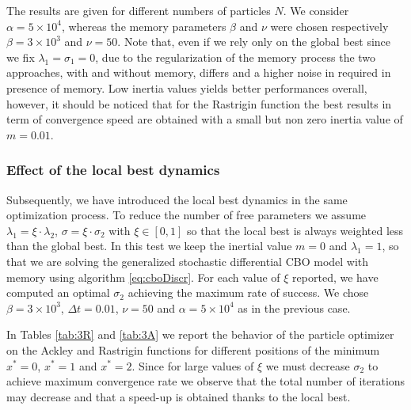 \documentclass{ims9x6}
\begin{document}
The results are given for different numbers of particles $N$. We consider $\alpha = 5 \times 10^4$, whereas
the memory parameters $\beta$ and $\nu$ were chosen respectively $\beta=3\times 10^3$ and $\nu=50$.
Note that, even if we rely only on the global best since we fix $\lambda_1=\sigma_1=0$, due to the regularization of the memory process the two approaches, with and without memory, differs and a higher noise in required in presence of memory. Low inertia values yields better performances overall, however, it should be noticed that for the Rastrigin function the best results in term of convergence speed are obtained with a small but non zero inertia value of $m=0.01$.  


\subsubsection{Effect of the local best dynamics}
Subsequently, we have introduced the local best dynamics in the same optimization process. To reduce the number of free parameters we assume $\lambda_1 = \xi \cdot \lambda_2$, $\sigma = \xi \cdot \sigma_2$
with $\xi \in [0,1]$ so that the local best is always weighted less than the global best. In this test we keep the inertial value $m = 0$ and $\lambda_1=1$, so that we are solving the generalized stochastic differential CBO model with memory using algorithm \eqref{eq:cboDiscr}. For each value of $\xi$ reported, we have computed an optimal $\sigma_2$ achieving the maximum rate of success. We chose $\beta = 3\times 10^3$, $\Delta t=0.01$, $\nu=50$  and  $\alpha = 5 \times 10^4$ as in the previous case. 

In Tables \ref{tab:3R} and \ref{tab:3A} we report the behavior of the particle optimizer on the Ackley and Rastrigin functions for different positions of the minimum $x^{\ast} = 0$, $x^{\ast} = 1$ and $x^{\ast} = 2$. Since for large values of $\xi$ we must decrease $\sigma_2$ to achieve maximum convergence rate we observe that the total number of iterations may decrease and that a speed-up is obtained thanks to the local best. 
\end{document}
